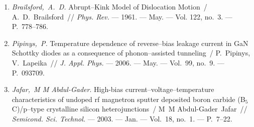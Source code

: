 \begin{enumerate}[label=\arabic*$^*$.,leftmargin=2em,itemindent=0cm]
\item
\emph{Brailsford,~A.~D.} Abrupt--Kink Model of Dislocation Motion~/
  A.~D.~Brailsford~// \emph{Phys. Rev.} ---
  1961. --- May. ---
  Vol. 122, no.~3. ---
  P.~778--786.

\item
\emph{Pipinys,~P.} Temperature dependence of reverse--bias leakage current
  in {G}a{N} {S}chottky diodes as a consequence of phonon--assisted tunneling~/
  P.~Pipinys, V.~Lapeika~// \emph{J. Appl. Phys.} ---
  2006. --- May. ---
  Vol.~99, no.~9. ---
  P.~093709.

\item
\emph{Jafar,~M M Abdul-Gader}. High-bias current--voltage--temperature
  characteristics of undoped rf magnetron sputter deposited boron carbide
  ({B}$_5${C})/p--type crystalline silicon heterojunctions~/ M~M
  Abdul-Gader~Jafar~// \emph{Semicond. Sci. Technol.} ---
  2003. --- Jan. ---
  Vol.~18, no.~1. ---
  P.~7--22.
\end{enumerate}
